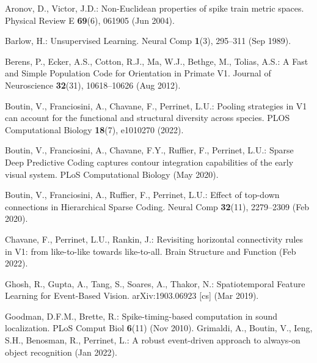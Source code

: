 \documentclass[runningheads]{llncs}
\begin{document}
{%
\begin{thebibliography}{10}
\providecommand{\url}[1]{\texttt{#1}}
\providecommand{\urlprefix}{URL }
\providecommand{\doi}[1]{}%

Aronov, D., Victor, J.D.: Non-{Euclidean} properties of spike train metric
  spaces. Physical Review E  \textbf{69}(6),  061905 (Jun 2004).
  
Barlow, H.: Unsupervised {Learning}. Neural Comp  \textbf{1}(3),
  295--311 (Sep 1989). %
  
Berens, P., Ecker, A.S., Cotton, R.J., Ma, W.J., Bethge, M., Tolias, A.S.: A
  {Fast} and {Simple} {Population} {Code} for {Orientation} in {Primate} {V1}.
  Journal of Neuroscience  \textbf{32}(31),  10618--10626 (Aug 2012).
  
Boutin, V., Franciosini, A., Chavane, F., Perrinet, L.U.: Pooling strategies in
  {V1} can account for the functional and structural diversity across species.
  PLOS Computational Biology  \textbf{18}(7),  e1010270 (2022).
  

Boutin, V., Franciosini, A., Chavane, F.Y., Ruffier, F., Perrinet, L.U.: Sparse
  {Deep} {Predictive} {Coding} captures contour integration capabilities of the
  early visual system. PLoS Computational Biology  (May 2020).
 

Boutin, V., Franciosini, A., Ruffier, F., Perrinet, L.U.: Effect of top-down
  connections in {Hierarchical} {Sparse} {Coding}. Neural Comp
  \textbf{32}(11),  2279--2309 (Feb 2020). %
  
Chavane, F., Perrinet, L.U., Rankin, J.: Revisiting horizontal connectivity
  rules in {V1}: from like-to-like towards like-to-all. Brain Structure and
  Function  (Feb 2022). %
  
Ghosh, R., Gupta, A., Tang, S., Soares, A., Thakor, N.: Spatiotemporal
  {Feature} {Learning} for {Event}-{Based} {Vision}. arXiv:1903.06923 [cs]
  (Mar 2019). %

Goodman, D.F.M., Brette, R.: Spike-timing-based computation in sound
  localization. PLoS Comput Biol  \textbf{6}(11) (Nov 2010).
Grimaldi, A., Boutin, V., Ieng, S.H., Benosman, R., Perrinet, L.: A robust
  event-driven approach to always-on object recognition  (Jan 2022).
  

\end{thebibliography}}
\end{document}
